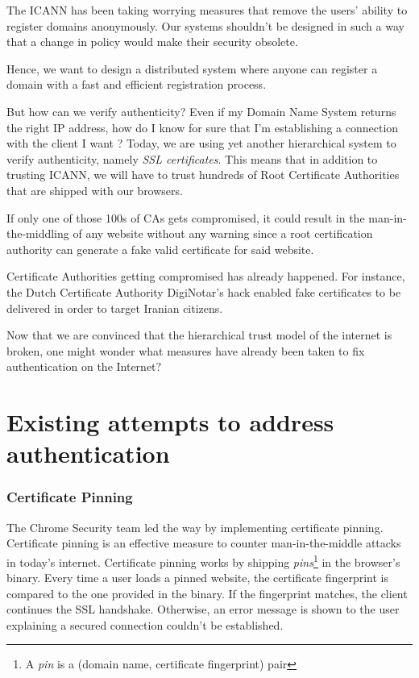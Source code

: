 \documentclass{vldb}
\begin{document}
The ICANN has been taking worrying measures that remove the users' ability to register domains anonymously\cite{icannabuse}. Our systems shouldn't be designed in such a way that a change in policy would make their security obsolete. 

Hence, we want to design a distributed system where anyone can register a domain with a fast and efficient registration process.

But how can we verify authenticity? 
Even if my Domain Name System returns the right IP address, how do I know for sure that I'm establishing a connection with the client I want ? Today, we are using yet another hierarchical system to verify authenticity, namely \emph{SSL certificates}. This means that in addition to trusting ICANN, we will have to trust hundreds of Root Certificate Authorities that are shipped with our browsers.\cite{mozillaSSL}

If only one of those 100s of CAs gets compromised, it could result in the man-in-the-middling of any website without any warning since a root certification authority can generate a fake valid certificate for said website.

Certificate Authorities getting compromised has already happened. For instance, the Dutch Certificate Authority DigiNotar's hack \cite{diginotarHack} enabled fake certificates to be delivered in order to target Iranian citizens.

Now that we are convinced that the hierarchical trust model of the internet is broken, one might wonder what measures have already been taken to fix authentication on the Internet?

\section{Existing attempts to address authentication}

\subsubsection{Certificate Pinning}

The Chrome Security team led the way by implementing certificate pinning. Certificate pinning is an effective measure to counter man-in-the-middle attacks in today's internet. Certificate pinning works by shipping \emph{pins}\footnote{A \emph{pin} is a (domain name, certificate fingerprint) pair} in the browser's binary.\cite{chromiumPins} Every time a user loads a pinned website, the certificate fingerprint is compared to the one provided in the binary. If the fingerprint matches, the client continues the SSL handshake. Otherwise, an error message is shown to the user explaining a secured connection couldn't be established.
\end{document}
